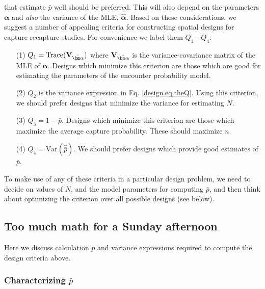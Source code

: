  that estimate $\bar{p}$ well should be preferred.  This will also
 depend on the parameters ${\bm \alpha}$ and {\it also} the variance
 of the MLE, $\hat{\bm \alpha}$. 
 Based on these considerations, 
we suggest a number of appealing criteria for constructing spatial
designs for capture-recapture studies.
For convenience we label them $Q_{1}$ - $Q_{4}$:
\begin{itemize}
\item[(1)] $Q_{1} = \mbox{Trace}({\bf V}_{\hat{\bm \alpha}})$ where ${\bf
    V}_{\hat{\bm \alpha}}$ is the variance-covariance matrix of the
  MLE of ${\bm \alpha}$. Designs which minimize this criterion
  are those which are good for estimating the parameters of the
  encounter probability model. 
\item[(2)] $Q_{2}$ is the variance expression in
  Eq. \ref{design.eq.theQ}. Using this criterion, we should prefer designs that minimize
  the variance for estimating $N$.
\item[(3)] $Q_{3} = 1-\bar{p}$. Designs which minimize this criterion
  are those which maximize the average capture probability. These
  should maximize $n$.
\item[(4)] $Q_{4} = \mbox{Var}(\hat{\bar{p}})$. We should prefer
  designs which provide good estimates of $\bar{p}$. 
\end{itemize}
To make use of any of these criteria in a particular design problem, we need
to decide on values of $N$, and the model parameters for computing
$\bar{p}$, and then think about optimizing the criterion over all
possible designs (see below).



\subsection{Too much math for a Sunday afternoon}

Here we discuss calculation $\bar{p}$ and variance expressions
required to compute the design criteria above. 

\subsubsection{Characterizing $\bar{p}$}

